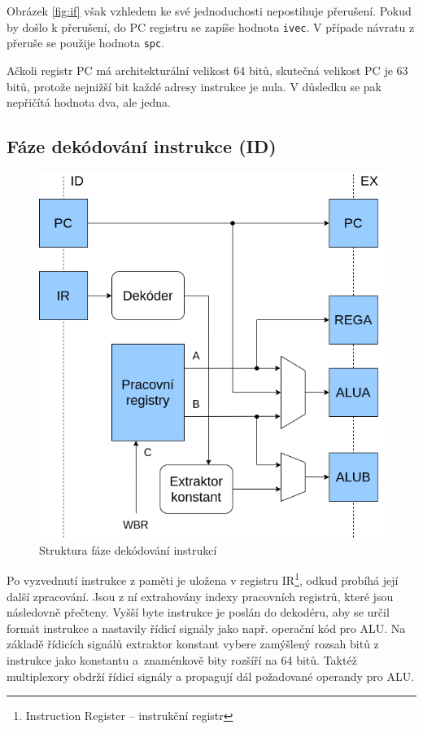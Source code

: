 \documentclass[
  digital, %
  color,   %
  table,   %
  twoside, %
  nolof,   %
  nolot,   %
]{fithesis3}
\begin{document}
Obrázek \ref{fig:if} však vzhledem ke své jednoduchosti nepostihuje přerušení. Pokud by došlo k přerušení, do PC registru se zapíše hodnota \texttt{ivec}. V případe návratu z přeruše se použije hodnota \texttt{spc}.

Ačkoli registr PC má architekturální velikost 64 bitů, skutečná velikost PC je 63 bitů, protože nejnižší bit každé adresy instrukce je nula. V důsledku se pak nepřičítá hodnota dva, ale jedna. \newpage

\subsection{Fáze dekódování instrukce (ID)}
\begin{figure}[H]
  \begin{center}
    \includegraphics[height=0.3\textheight]{img/risc63-id}
  \end{center}
  \caption{Struktura fáze dekódování instrukcí}
\end{figure}

Po vyzvednutí instrukce z paměti je uložena v registru IR\footnote{Instruction Register -- instrukční registr}, odkud probíhá její další zpracování. Jsou z ní extrahovány indexy pracovních registrů, které jsou následovně přečteny. Vyšší byte instrukce je poslán do dekodéru, aby se určil formát instrukce a nastavily řídicí signály jako např. operační kód pro ALU. Na základě řídicích signálů extraktor konstant vybere zamýšlený rozsah bitů z instrukce jako konstantu a~znaménkově bity rozšíří na 64 bitů. Taktéž multiplexory obdrží řídicí signály a propagují dál požadované operandy pro ALU.
\end{document}

